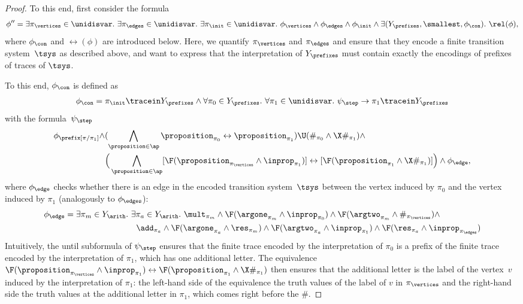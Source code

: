 \begin{proof}
To this end, first consider the formula
\begin{align*}
\phi'' = \exists \pi_\vertices \in \unidisvar.\ \exists \pi_\edges \in \unidisvar.\ \exists \pi_\init \in \unidisvar.\ \phi_\vertices \wedge \phi_\edges \wedge \phi_\init \wedge \exists (Y_\prefixes,\smallest, \phi_\con).\ \rel(\phi),
\end{align*}
where $\phi_\con$ and $\rel(\phi)$ are introduced below.
Here, we quantify $\pi_\vertices$ and $\pi_\edges$ and ensure that they encode a finite transition system~$\tsys$ as described above, and want to express that the interpretation of $Y_\prefixes$  must contain exactly the encodings of prefixes of traces of $\tsys$. 

To this end, $\phi_\con$ is defined as 
\begin{align*}
	\phi_\con = \pi_\init \tracein Y_\prefixes \wedge \forall \pi_0 \in Y_\prefixes.\ \forall \pi_1 \in \unidisvar.\ 
	\psi_\step \rightarrow \pi_1 \tracein Y_\prefixes
\end{align*}
with the formula~$\psi_\step $
\begin{align*}
\phi_\prefix[\pi/\pi_1] \wedge &
	(\bigwedge_{\proposition \in \ap} \proposition_{\pi_0} \leftrightarrow \proposition_{\pi_1}) \U(\#_{\pi_0} \wedge \X \#_{\pi_1}) \wedge\\
&	\Big(\bigwedge_{\proposition \in \ap} [\F(\proposition_{\pi_\vertices} \wedge \inprop_{\pi_1}) ]\leftrightarrow [\F(\proposition_{\pi_1}  \wedge \X\#_{\pi_1})] \Big) \wedge 
\phi_{\edge},    
\end{align*}
where $\phi_\edge$ checks whether there is an edge in the encoded transition system~$\tsys$ between the vertex induced by $\pi_0$ and the vertex induced by $\pi_1$ (analogously to $\phi_\edges$):
\begin{align*}
\phi_\edge = \exists \pi_m \in Y_\arith.\ \exists \pi_a\in Y_\arith.\
{}&{}
\mult_{\pi_m} \wedge
\F(\argone_{\pi_m} \wedge \inprop_{\pi_0}) \wedge
\F(\argtwo_{\pi_m} \wedge \#_{\pi_\vertices}) \wedge\\
{}&{}\hspace{-2cm}
\add_{\pi_a} \wedge
\F(\argone_{\pi_a} \wedge \res_{\pi_m} ) \wedge
\F(\argtwo_{\pi_a} \wedge \inprop_{\pi_1}) \wedge
\F(\res_{\pi_a} \wedge \inprop_{\pi_\edges})
\end{align*}
Intuitively, the until subformula of $\psi_\step$ ensures that the finite trace encoded by the interpretation of $\pi_0$ is a prefix of the finite trace encoded by the interpretation of $\pi_1$, which has one additional letter.
The equivalence~$\F(\proposition_{\pi_\vertices} \wedge \inprop_{\pi_1}) \leftrightarrow \F(\proposition_{\pi_1}  \wedge \X\#_{\pi_1})$ then ensures that the additional letter is the label of the vertex~$v$ induced by the interpretation of $\pi_1$: the left-hand side of the equivalence  the truth values of the label of $v$ in $\pi_\vertices$ and the right-hand side the truth values at the additional letter in $\pi_1$, which comes right before the $\#$.


\end{proof}
